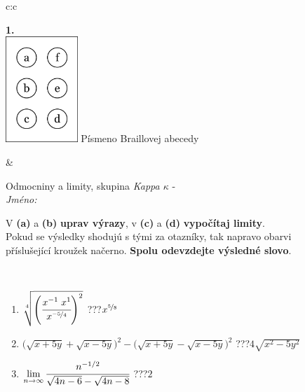 \documentclass[10pt]{report}
\begin{document}
\begin{tabular}{c:c}
\begin{minipage}[c][104.5mm][t]{0.5\linewidth}
\begin{center}
\begin{minipage}{0.20\linewidth}
\begin{center}
{\Huge\bfseries 1.} \\[2mm]
\includegraphics[height=40mm]{../images/braille.png}
{\small Písmeno Braillovej abecedy}
\end{center}
\end{minipage}
\end{center}
\end{minipage}
&
\begin{minipage}[c][104.5mm][t]{0.5\linewidth}
\begin{center}
\vspace{7mm}
{\huge Odmocniny a limity, skupina \textit{Kappa $\kappa$} -}\\[5mm]
\textit{Jméno:}\phantom{xxxxxxxxxxxxxxxxxxxxxxxxxxxxxxxxxxxxxxxxxxxxxxxxxxxxxxxxxxxxxxxxx}\\[5mm]
\begin{minipage}{0.95\linewidth}
\begin{center}
V \textbf{(a)} a \textbf{(b)} \textbf{uprav výrazy}, v \textbf{(c)} a \textbf{(d)} \textbf{vypočítaj limity}.\\Pokud se výsledky shodujú s tými za otazníky, tak napravo obarvi\\příslušející kroužek načerno. \textbf{Spolu odevzdejte výsledné slovo}.
\end{center}
\end{minipage}
\\[1mm]
\begin{minipage}{0.79\linewidth}
\begin{center}
\begin{varwidth}{\linewidth}
\begin{enumerate}
\small
\item $\sqrt[4]{\left(\cfrac{x^{-1}\;x^{1}}{x^{\nicefrac{-5}{4}}}\right)^{2}}$\quad \dotfill\; ???\;\dotfill \quad $x^{\nicefrac{5}{8}}$
\item {\footnotesize{\scriptsize$\big(\sqrt{x+5y}+\sqrt{x-5y}\big)^2-\big(\sqrt{x+5y}-\sqrt{x-5y}\big)^2$}\quad \dotfill\; ???\;\dotfill \quad $4\sqrt{x^2-5y^2}$}
\item $\lim\limits_{n\to\infty}\cfrac{n^{-1/2}}{\sqrt{4n-6}-\sqrt{4n-8}}$\quad \dotfill\; ???\;\dotfill \quad $2$

\end{enumerate}
\end{varwidth}
\end{center}
\end{minipage}
\end{center}
\end{minipage}
\end{tabular}
\end{document}
